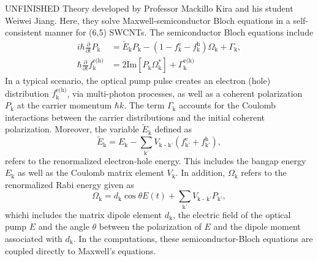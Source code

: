 {\color{red} UNFINISHED} Theory developed by Professor Mackillo Kira and his student Weiwei Jiang. Here, they solve Maxwell-semiconductor Bloch equations \cite{kira2011semiconductor, hirtschulz2008carbon} in a self-consistent manner for (6,5) SWCNTs. The semiconductor Bloch equations include
%
\begin{equation}
	\begin{split}
	i \hbar \frac{\partial}{\partial t} P_\text{k} &= \tilde{E}_\text{k} P_\text{k} - ( 1- f^\text{e}_\text{k} - f^\text{h}_\text{k})\Omega_\text{k} + \Gamma_\text{k}, \\
	\hbar \frac{\partial }{\partial t} f_\text{k}^\text{e(h)} &= 2 \text{Im}[P_\text{k}\Omega_\text{k}^*] + \Gamma^\text{e(h)}_\text{k}
	\end{split}
\end{equation}
%
 In a typical scenario, the optical pump pulse creates an electron (hole) distribution $f_\text{k}^\text{e(h)}$, via multi-photon processes, as well as a coherent polarization $P_\text{k}$ at the carrier momentum $\hbar k$. The term $\Gamma_\text{k}$ accounts for the Coulomb interactions between the carrier distributions and the initial coherent polarization. Moreover, the variable $\tilde{E}_\text{k}$ defined as
%
\begin{equation}
	\tilde{E}_\text{k} = E_\text{k} - \sum_\text{k'} V_\text{k - k'} ( f_\text{k'}^\text{e} + f_\text{k'}^\text{h}),
\end{equation}
%
refers to the renormalized electron-hole energy. This includes the bangap energy $E_\text{k}$ as well as the Coulomb matrix element $V_\text{k}$. In addition, $\Omega_\text{k}$ refers to the renormalized Rabi energy given as
\begin{equation}
	\Omega_\text{k} = d_\text{k} \cos\theta E(t) + \sum_\text{k'} V_\text{k - k'} P_\text{k'},
\end{equation}
whichi includes the matrix dipole element $d_\text{k}$, the electric field of the optical pump $E$ and the angle $\theta$ between the polarization of $E$ and the dipole moment associated with $d_\text{k}$. In the computations, these semiconductor-Bloch equations are coupled directly to Maxwell's equations.

